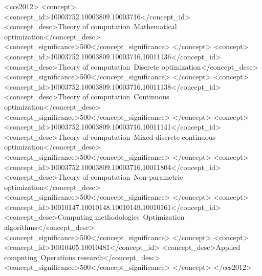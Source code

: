 
\begin{CCSXML}
    <ccs2012>
    <concept>
        <concept_id>10003752.10003809.10003716</concept_id>
        <concept_desc>Theory of computation~Mathematical optimization</concept_desc>
        <concept_significance>500</concept_significance>
    </concept>
    <concept>
        <concept_id>10003752.10003809.10003716.10011136</concept_id>
        <concept_desc>Theory of computation~Discrete optimization</concept_desc>
        <concept_significance>500</concept_significance>
    </concept>
    <concept>
        <concept_id>10003752.10003809.10003716.10011138</concept_id>
        <concept_desc>Theory of computation~Continuous optimization</concept_desc>
        <concept_significance>500</concept_significance>
    </concept>
    <concept>
        <concept_id>10003752.10003809.10003716.10011141</concept_id>
        <concept_desc>Theory of computation~Mixed discrete-continuous optimization</concept_desc>
        <concept_significance>500</concept_significance>
    </concept>
    <concept>
        <concept_id>10003752.10003809.10003716.10011804</concept_id>
        <concept_desc>Theory of computation~Non-parametric optimization</concept_desc>
        <concept_significance>500</concept_significance>
    </concept>
    <concept>
        <concept_id>10010147.10010148.10010149.10010161</concept_id>
        <concept_desc>Computing methodologies~Optimization algorithms</concept_desc>
        <concept_significance>500</concept_significance>
    </concept>
    <concept>
        <concept_id>10010405.10010481</concept_id>
        <concept_desc>Applied computing~Operations research</concept_desc>
        <concept_significance>500</concept_significance>
    </concept>
    </ccs2012>
\end{CCSXML}


